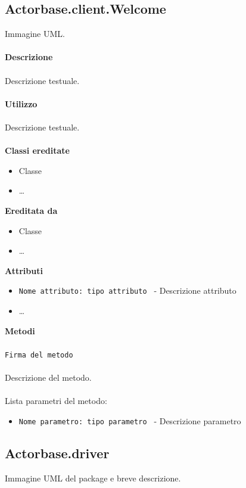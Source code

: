 \documentclass[a4paper]{article}
\begin{document}
	\subsection{Actorbase.client.Welcome}	
		Immagine UML.
		\\ \\
		\textbf{Descrizione}
			\\ \\
			Descrizione testuale.
			\\ \\
		\textbf{Utilizzo}
			\\ \\
			Descrizione testuale.
			\\ \\
		\textbf{Classi ereditate}
			\begin{itemize}
				\item Classe
				\item \dots
			\end{itemize}
		\textbf{Ereditata da}
			\begin{itemize}
				\item Classe
				\item \dots
			\end{itemize}
		\textbf{Attributi}
			\begin{itemize}
				\item \texttt{Nome attributo: tipo attributo } - Descrizione attributo
				\item \dots
			\end{itemize}
		\textbf{Metodi}
			\\ \\
			\texttt{Firma del metodo}
			\\ \\
			Descrizione del metodo.
			\\ \\
			Lista parametri del metodo:
			\begin{itemize}
				\item \texttt{Nome parametro: tipo parametro } - Descrizione parametro
			\end{itemize}
			
	\subsection{Actorbase.driver}
		Immagine UML del package e breve descrizione.
		
\end{document}
